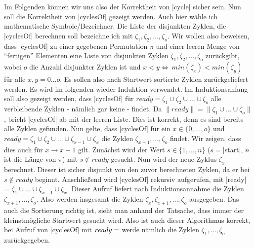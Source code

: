 Im Folgenden können wir uns also der Korrektheit von |cycle| sicher sein. Nun soll die Korrektheit von |cyclesOf| gezeigt werden.
Auch hier wähle ich mathematische Symbole/Bezeichner. Die Liste der disjunkten Zyklen, die |cyclesOf| berechnen soll bezeichne ich mit $\zeta_1, \zeta_2, \dots, \zeta_o$.
Wir wollen also beweisen, dass |cyclesOf| zu einer gegebenen Permutation $\pi$ und einer leeren Menge von ``fertigen'' Elementen eine Liste
von disjunkten Zyklen $\zeta_1, \zeta_2, \dots, \zeta_o$ zurückgibt, wobei $o$ die Anzahl disjunkter Zyklen ist und $x < y \Leftrightarrow \ min(\zeta_x) < min(\zeta_y)$ für alle $x,y=0 \dots o$.
Es sollen also nach Startwert sortierte Zyklen zurückgeliefert werden.
Es wird im folgenden wieder Induktion verwendet.
Im Induktionsanfang soll also gezeigt werden, dass |cyclesOf| für $ready = \zeta_1 \cup \zeta_2 \cup \dots \cup \zeta_o$ alle verbleibende Zyklen - nämlich gar keine - findet.
Da $\|ready\| = \|\zeta_1 \cup \dots \cup \zeta_o\|$, bricht |cyclesOf| ab mit der leeren Liste. Dies ist korrekt, denn es sind bereits alle Zyklen gefunden.
Nun gelte, dass |cyclesOf| für ein $x \in \{0, \dots, o\}$ und $ready = \zeta_1 \cup \zeta_2 \cup \dots \cup \zeta_{x-1} \cup \zeta_x$ die Zyklen $\zeta_{x+1}, \dots, \zeta_o$ findet.
Wir zeigen, dass dies auch für $x \rightarrow x-1$ gilt.
Zunächst wird der Wert $s \in \{1, \dots, n\}$ ($s=$|start|, $n$ ist die Länge von $\pi$) mit $s \notin ready$ gesucht.
Nun wird der neue Zyklus $\zeta_x$ berechnet. Dieser ist sicher disjunkt von den zuvor berechneten Zyklen, da er bei $s \notin ready$ beginnt.
Anschließend wird |cyclesOf| rekursiv aufgerufen, mit |ready| = $\zeta_1 \cup \dots \cup \zeta_{x-1} \cup \zeta_{x}$.
Dieser Aufruf liefert nach Induktionsannahme die Zyklen $\zeta_{x+1}, \dots, \zeta_o$.
Also werden insgesamt die Zyklen $\zeta_{x}, \zeta_{x+1}, \dots, \zeta_o$ ausgegeben.
Das auch die Sortierung richtig ist, sieht man anhand der Tatsache, dass immer der kleinstmögliche Startwert gesucht wird.
Also ist auch dieser Algorithmus korrekt, bei Aufruf von |cyclesOf| mit $ready = \empty$ werde nämlich die Zyklen $\zeta_1, \dots, \zeta_o$ zurückgegeben.\\


